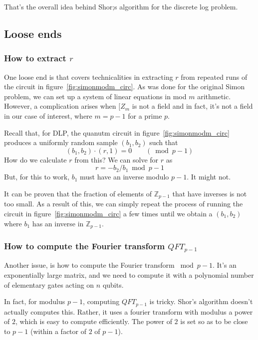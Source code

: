 That's the overall idea behind Shor;s algorithm for the discrete log problem. 

\subsection{Loose ends}
\subsubsection{How to extract $r$}
One loose end is that covers technicalities in extracting $r$ from repeated runs of the circuit in figure~\ref{fig:simonmodm_circ}. As was done for the original Simon problem, we can set up a system of linear equations in mod $m$ arithmetic. However, a complication arises when $\mathbb[{Z}_m$ is not a field and in fact, it's not a field in our case of interest, where $m=p-1$ for a prime $p$.

Recall that, for DLP, the quanutm circuit in figure~\ref{fig:simonmodm_circ} produces a uniformly random sample $(b_1,b_2)$ such that
\[
(b_1,b_2)\cdot (r,1)=0 \qquad (\bmod p-1)
\]
How do we calculate $r$ from this? We can solve for $r$ as
\[
r=-b_2/b_1 \bmod p-1
\]
But, for this to work, $b_1$ must have an inverse modulo $p-1$. It might not.

It can be proven that the fraction of elements of $\mathbb{Z}_{p-1}$ that have inverses is not too small. As a result of this, we can simply repeat the process of running the circuit in figure~\ref{fig:simonmodm_circ} a few times until we obtain a $(b_1,b_2)$ where $b_1$ has an inverse in $\mathbb{Z}_{p-1}$.

\subsubsection{How to compute the Fourier transform $QFT_{p-1}$}
Another issue, is how to compute the Fourier transform $\bmod p-1$. It's an exponentially large matrix, and we need to compute it with a polynomial number of elementary gates acting on $n$ qubits.

In fact, for modulus $p-1$, computing $QFT_{p-1}$ is tricky. Shor's algorithm doesn't actually computes this. Rather, it uses a fourier transform with modulus a power of $2$, which is easy to compute efficiently. The power of $2$ is set so as to be close to $p-1$ (within a factor of $2$ of $p-1$).

